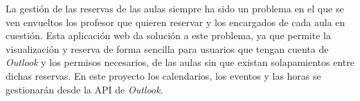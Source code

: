 
La gestión de las reservas de las aulas siempre ha sido un problema en el que se ven envueltos los profesor que quieren reservar y los encargados de cada aula en cuestión.
Esta aplicación web da solución a este problema, ya que permite la visualización y reserva de forma sencilla para usuarios que tengan cuenta de \textit{Outlook} y los permisos necesarios, de las aulas sin que existan solapamientos entre dichas reservas. En este proyecto los calendarios, los eventos y las horas se gestionarán desde la API de \textit{Outlook}.